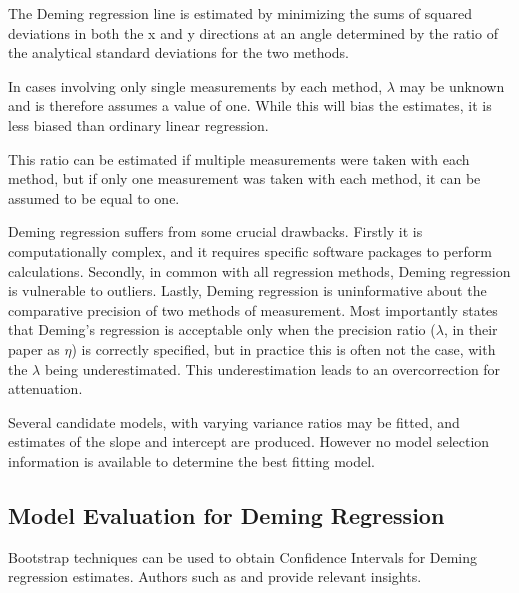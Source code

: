 \documentclass[12pt, a4paper]{report}
\theoremstyle{plain}
\theoremstyle{definition}
\theoremstyle{remark}
\begin{document}




The Deming regression line is estimated by minimizing the sums of squared deviations in both the x and y directions at an angle determined by the ratio of the analytical standard deviations for the two methods.
	
In cases involving only single measurements by each method, $\lambda$ may be unknown and is therefore assumes a value of one. While this will bias the estimates, it is less biased than ordinary linear regression.
	
This ratio can be estimated if multiple measurements were taken with each method, but if only one measurement was taken with each method, it can be assumed to be equal to one.
	

	

	
Deming regression suffers from some crucial drawbacks. Firstly it is computationally complex, and it requires specific software packages to perform calculations. Secondly, in common with all regression methods, Deming regression is vulnerable to outliers. Lastly, Deming regression is uninformative about the comparative precision of two methods of measurement. Most importantly \citet{CarollRupert} states that Deming's regression is acceptable only when the precision ratio ($\lambda$, in their paper as $\eta$) is correctly specified, but in practice this is often not the case, with the $\lambda$ being underestimated. This underestimation leads to an overcorrection for attenuation.

Several candidate models, with varying variance ratios may be fitted, and estimates of the slope and intercept are produced. However no model selection information is available to determine the best fitting model.
	

\subsection{Model Evaluation for Deming Regression}
	Bootstrap techniques can be used to obtain Confidence Intervals for Deming regression estimates. Authors such as 
	\citet{carpenter2000bootstrap} and \citet{johnson2001bootstrap} provide relevant insights.
	
\end{document}

